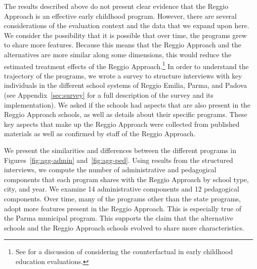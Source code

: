 The results described above do not present clear evidence that the Reggio Approach is an effective early childhood program. However, there are several considerations of the evaluation context and the data that we expand upon here. We consider the possibility that it is possible that over time, the programs grew to share more features. Because this means that the Reggio Approach and the alternatives are more similar along some dimensions, this would reduce the estimated treatment effects of the Reggio Approach.\footnote{See \citet{Elango_Hojman_etal_2016_Early-Edu} for a discussion of considering the counterfactual in early childhood education evaluations.} In order to understand the trajectory of the programs, we wrote a survey to structure interviews with key individuals in the different school systems of Reggio Emilia, Parma, and Padova (see Appendix~\ref{sec:survey} for a full description of the survey and its implementation). We asked if the schools had aspects that are also present in the Reggio Approach schools, as well as details about their specific programs. These key aspects that make up the Reggio Approach were collected from published materials as well as confirmed by staff of the Reggio Approach. 

We present the similarities and differences between the different programs in Figures~\ref{fig:agg-admin} and~\ref{fig:agg-ped}. Using results from the structured interviews, we compute the number of administrative and pedagogical components that each program shares with the Reggio Approach by school type, city, and year. We examine 14 administrative components and 12 pedagogical components. Over time, many of the programs other than the state programs, adopt more features present in the Reggio Approach. This is especially true of the Parma municipal program. This supports the claim that the alternative schools and the Reggio Approach schools evolved to share more characteristics.

